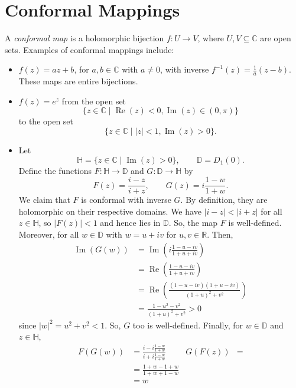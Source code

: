 \documentclass[a4paper, openany]{memoir}
\theoremstyle{definition}
\theoremstyle{plain}
\begin{document}
    \section{Conformal Mappings}
    A \emph{conformal map} is a holomorphic bijection $f \colon U \to V$, where $U, V \subseteq \mathbb{C}$ are open sets. Examples of conformal mappings include:
    \begin{itemize}
        \item $f(z) = az + b$, for $a, b \in \mathbb{C}$ with $a \neq 0$, with inverse $f^{-1}(z) = \frac{1}{a}(z - b)$. These maps are entire bijections.
        \item $f(z) = e^z$ from the open set 
        \[\{z \in \mathbb{C} \mid \operatorname{Re}(z) < 0, \operatorname{Im}(z) \in (0, \pi)\}\]
        to the open set
        \[\{z \in \mathbb{C} \mid |z| < 1, \operatorname{Im}(z) > 0\}.\]
        \item Let
        \[\mathbb{H} = \{z \in \mathbb{C} \mid \operatorname{Im}(z) > 0\}, \qquad \mathbb{D} = D_1(0).\]
        Define the functions $F \colon \mathbb{H} \to \mathbb{D}$ and $G \colon \mathbb{D} \to \mathbb{H}$ by
        \[F(z) = \frac{i - z}{i + z}, \qquad G(z) = i \frac{1 - w}{1 + w}.\] 
        We claim that $F$ is conformal with inverse $G$. By definition, they are holomorphic on their respective domains. We have $|i - z| < |i + z|$ for all $z \in \mathbb{H}$, so $|F(z)| < 1$ and hence lies in $\mathbb{D}$. So, the map $F$ is well-defined. Moreover, for all $w \in \mathbb{D}$ with $w = u + iv$ for $u, v \in \mathbb{R}$. Then,
        \begin{align*}
            \operatorname{Im}(G(w)) &= \operatorname{Im} \left(i \frac{1 - u - iv}{1 + u + iv}\right) \\
            &= \operatorname{Re} \left(\frac{1 - u - iv}{1 + u + iv}\right) \\
            &= \operatorname{Re} \left(\frac{(1 - u - iv)(1 + u - iv)}{(1 + u)^2 + v^2}\right) \\
            &= \frac{1 - u^2 - v^2}{(1 + u)^2 + v^2} > 0
        \end{align*}
        since $|w|^2 = u^2 + v^2 < 1$. So, $G$ too is well-defined. Finally, for $w \in \mathbb{D}$ and $z \in \mathbb{H}$,
        \begin{align*}
            F(G(w)) &= \frac{i - i\frac{1 - w}{1 + w}}{i + i \frac{1 - w}{1 + w}} & G(F(z)) &= \\
            &= \frac{1 + w - 1 + w}{1 + w + 1 - w} \\
            &= w
        \end{align*}
    \end{itemize}
\end{document}
